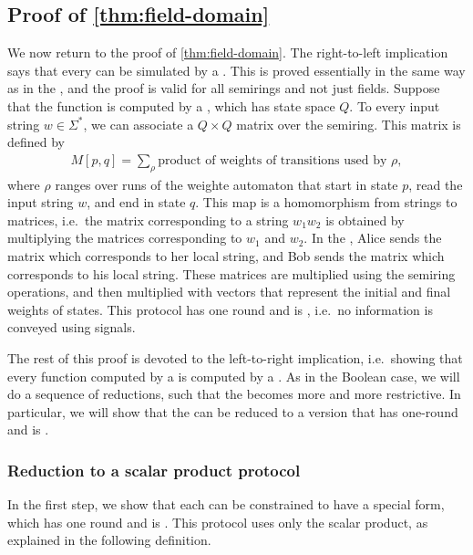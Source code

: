 \subsection{Proof of \cref{thm:field-domain}}
\label{sec:proof-of-thm-field-domain}
\AP
We now return to the proof of \cref{thm:field-domain}. The right-to-left
implication says that every  can be simulated by a .
This is proved essentially in the same way as in the , and the proof is valid for all semirings and not just fields. 
Suppose that
the function is computed by a , which has state space $Q$. To every input string $w \in \Sigma^*$, we can associate a $Q \times Q$ matrix over the semiring. This matrix is defined by 
\begin{align*}
M[p,q] = \sum_\rho \text{product of weights of transitions used by $\rho$},
\end{align*}
where $\rho$ ranges over runs of the weighte automaton that start in state $p$, read the input string $w$, and end in state $q$. This map is a homomorphism from strings to matrices, i.e.~the matrix corresponding to a string $w_1 w_2$ is obtained by multiplying the matrices corresponding to $w_1$ and $w_2$. In the , Alice sends
the matrix  which corresponds to her local string, and Bob sends the  matrix
which corresponds to  his local string. These matrices are multiplied using the
semiring operations, and then multiplied with vectors that represent the initial and final weights of states. This
protocol has one round and is , i.e.~no information is conveyed
using signals.

The rest of this proof is devoted to the left-to-right implication,
i.e.~showing that every function computed by a  is computed by a
. As in the Boolean case, we will do a sequence of
reductions, such that the  becomes more and more restrictive. In
particular, we will show that the  can be reduced to a version that has
one-round and is .

\subsubsection{Reduction to a scalar product protocol}
\label{sec:reduction-to-scalar-product-protocols}
\AP
In the first step, we show that each  can be constrained to have a
special form, which has one round and is . This protocol uses only
the scalar product,  as explained in the following definition. 

